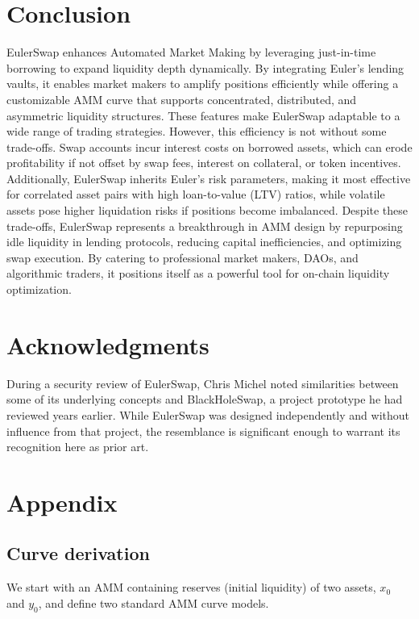 \documentclass{article}
\begin{document}
\section{Conclusion}

EulerSwap enhances Automated Market Making by leveraging just-in-time borrowing to expand liquidity depth dynamically. By integrating Euler’s lending vaults, it enables market makers to amplify positions efficiently while offering a customizable AMM curve that supports concentrated, distributed, and asymmetric liquidity structures. These features make EulerSwap adaptable to a wide range of trading strategies. However, this efficiency is not without some trade-offs. Swap accounts incur interest costs on borrowed assets, which can erode profitability if not offset by swap fees, interest on collateral, or token incentives. Additionally, EulerSwap inherits Euler’s risk parameters, making it most effective for correlated asset pairs with high loan-to-value (LTV) ratios, while volatile assets pose higher liquidation risks if positions become imbalanced. Despite these trade-offs, EulerSwap represents a breakthrough in AMM design by repurposing idle liquidity in lending protocols, reducing capital inefficiencies, and optimizing swap execution. By catering to professional market makers, DAOs, and algorithmic traders, it positions itself as a powerful tool for on-chain liquidity optimization.

\section*{Acknowledgments}

During a security review of EulerSwap, Chris Michel noted similarities between some of its underlying concepts and BlackHoleSwap, a project prototype he had reviewed years earlier. While EulerSwap was designed independently and without influence from that project, the resemblance is significant enough to warrant its recognition here as prior art.

\newpage
\section{Appendix}

\subsection{Curve derivation}
\label{sec:curve-derivation}

We start with an AMM containing reserves (initial liquidity) of two assets, \( x_0 \) and \( y_0 \), and define two standard AMM curve models.
\end{document}
